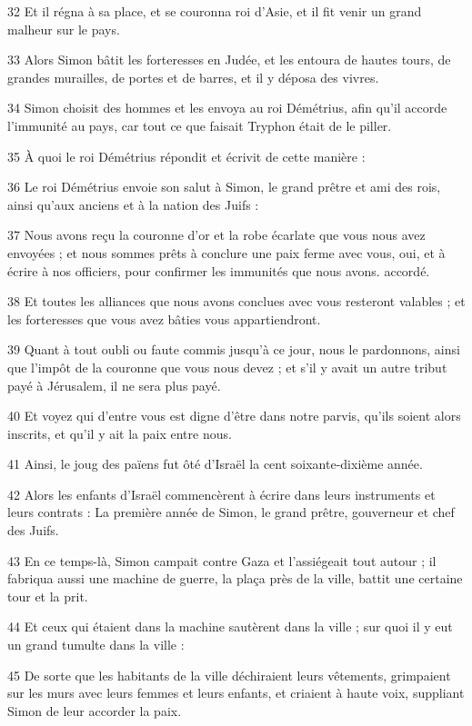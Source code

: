 \par 32 Et il régna à sa place, et se couronna roi d'Asie, et il fit venir un grand malheur sur le pays.
\par 33 Alors Simon bâtit les forteresses en Judée, et les entoura de hautes tours, de grandes murailles, de portes et de barres, et il y déposa des vivres.
\par 34 Simon choisit des hommes et les envoya au roi Démétrius, afin qu'il accorde l'immunité au pays, car tout ce que faisait Tryphon était de le piller.
\par 35 À quoi le roi Démétrius répondit et écrivit de cette manière :
\par 36 Le roi Démétrius envoie son salut à Simon, le grand prêtre et ami des rois, ainsi qu'aux anciens et à la nation des Juifs :
\par 37 Nous avons reçu la couronne d'or et la robe écarlate que vous nous avez envoyées ; et nous sommes prêts à conclure une paix ferme avec vous, oui, et à écrire à nos officiers, pour confirmer les immunités que nous avons. accordé.
\par 38 Et toutes les alliances que nous avons conclues avec vous resteront valables ; et les forteresses que vous avez bâties vous appartiendront.
\par 39 Quant à tout oubli ou faute commis jusqu'à ce jour, nous le pardonnons, ainsi que l'impôt de la couronne que vous nous devez ; et s'il y avait un autre tribut payé à Jérusalem, il ne sera plus payé.
\par 40 Et voyez qui d'entre vous est digne d'être dans notre parvis, qu'ils soient alors inscrits, et qu'il y ait la paix entre nous.
\par 41 Ainsi, le joug des païens fut ôté d'Israël la cent soixante-dixième année.
\par 42 Alors les enfants d'Israël commencèrent à écrire dans leurs instruments et leurs contrats : La première année de Simon, le grand prêtre, gouverneur et chef des Juifs.
\par 43 En ce temps-là, Simon campait contre Gaza et l'assiégeait tout autour ; il fabriqua aussi une machine de guerre, la plaça près de la ville, battit une certaine tour et la prit.
\par 44 Et ceux qui étaient dans la machine sautèrent dans la ville ; sur quoi il y eut un grand tumulte dans la ville :
\par 45 De sorte que les habitants de la ville déchiraient leurs vêtements, grimpaient sur les murs avec leurs femmes et leurs enfants, et criaient à haute voix, suppliant Simon de leur accorder la paix.
